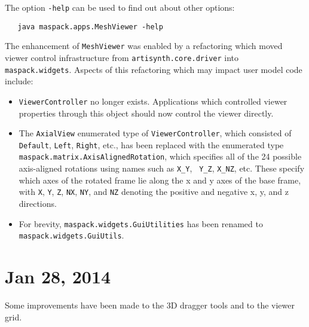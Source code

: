 \documentclass{article}
\begin{document}
The option {\tt -help} can be used to find out about other options:
\begin{verbatim}
   java maspack.apps.MeshViewer -help
\end{verbatim}

The enhancement of {\tt MeshViewer} was enabled by a refactoring which
moved viewer control infrastructure from {\tt artisynth.core.driver} into
{\tt maspack.widgets}. Aspects of this refactoring which may impact
user model code include:

\begin{itemize}

\item {\tt ViewerController} no longer exists. Applications which
controlled viewer properties through this object should now control
the viewer directly.

\item The {\tt AxialView} enumerated type of {\tt ViewerController},
which consisted of {\tt Default}, {\tt Left}, {\tt Right}, etc., has
been replaced with the enumerated type {\tt
maspack.matrix.AxisAlignedRotation}, which specifies all of the 24
possible axis-aligned rotations using names such as {\tt X\_Y}, {\tt
Y\_Z}, {\tt X\_NZ}, etc. These specify which axes of the rotated frame
lie along the x and y axes of the base frame, with {\tt X}, {\tt Y},
{\tt Z}, {\tt NX}, {\tt NY}, and {\tt NZ} denoting the positive and
negative x, y, and z directions.

\item For brevity, {\tt maspack.widgets.GuiUtilities} has been renamed
to {\tt maspack.widgets.GuiUtils}.

\end{itemize}

\section*{Jan 28, 2014}

Some improvements have been made to the 3D dragger tools and to the
viewer grid.
\end{document}
